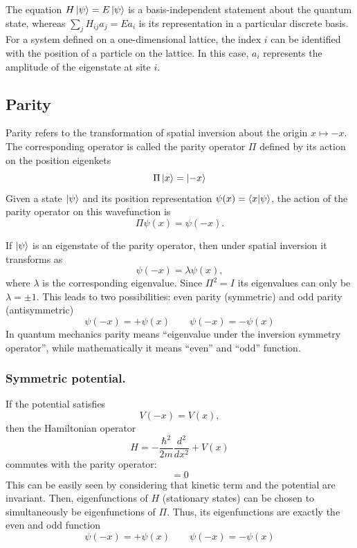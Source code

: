 \documentclass[../../../main.tex]{subfiles}
\begin{document}
The equation $H\ket{\psi}=E\ket{\psi}$ is a basis-independent statement about the quantum state, whereas $\textstyle\sum_j H_{ij}a_j=Ea_i$ is its representation in a particular discrete basis.
For a system defined on a one-dimensional lattice, the index $i$ can be
identified with the position of a particle on the lattice. 
In this case, $a_i$ represents the amplitude of the eigenstate at site $i$.

\subsection{Parity}
Parity refers to the transformation of spatial inversion about the origin $x \mapsto -x$.
The corresponding operator is called the parity operator $\Pi$ defined by its action on the position eigenkets
\begin{equation*}
    \Pi \ket{x }=\ket{-x}
\end{equation*}
Given a state $\ket{\psi}$ and its position representation $\psi(x) = \braket{x|\psi}$, the action of the parity operator on this wavefunction is
\begin{equation*}
    \Pi\psi(x) = \psi(-x) .
\end{equation*}

If $\ket{\psi}$ is an eigenstate of the parity operator, then under spatial inversion it transforms as
\begin{equation*}
    \psi(-x) = \lambda   \psi(x) ,
\end{equation*}
where $\lambda$ is the corresponding eigenvalue.
Since $\Pi^2 = I $ its eigenvalues can only be $\lambda = \pm 1$.
This leads to two possibilities: even parity (symmetric) and odd parity (antisymmetric)
\begin{equation*}
    \psi(-x) = +\psi(x) \qquad    \psi(-x) = -\psi(x)
\end{equation*}
In quantum mechanics parity means \enquote{eigenvalue under the inversion symmetry operator}, while mathematically it means \enquote{even} and \enquote{odd} function.

\subsubsection{Symmetric potential.}
If the potential satisfies
\begin{equation*}
    V(-x) = V(x) ,
\end{equation*}
then the Hamiltonian operator
\begin{equation*}
    H = -\frac{\hbar^2}{2m}\frac{d^2}{dx^2} + V(x)
\end{equation*}
commutes with the parity operator:
\begin{equation*}
    [H, \Pi] = 0
\end{equation*}
This can be easily seen  by considering that kinetic term and the potential are invariant.
Then, eigenfunctions of $H$ (stationary states) can be chosen to simultaneously be eigenfunctions of $\Pi$.
Thus, its eigenfunctions are exactly the even and odd function
\begin{equation*}
    \psi(-x) = +\psi(x) \qquad    \psi(-x) = -\psi(x)
\end{equation*}
\end{document}
